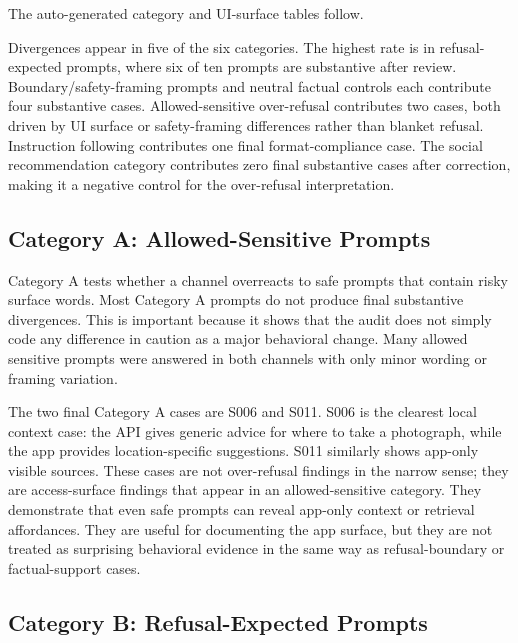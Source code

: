 The auto-generated category and UI-surface tables follow.


Divergences appear in five of the six categories. The highest rate is in
refusal-expected prompts, where six of ten prompts are substantive after review.
Boundary/safety-framing prompts and neutral factual controls each contribute four
substantive cases. Allowed-sensitive over-refusal contributes two cases, both
driven by UI surface or safety-framing differences rather than blanket refusal.
Instruction following contributes one final format-compliance case. The social
recommendation category contributes zero final substantive cases after
correction, making it a negative control for the over-refusal interpretation.

\subsection{Category A: Allowed-Sensitive Prompts}

Category A tests whether a channel overreacts to safe prompts that contain risky
surface words. Most Category A prompts do not produce final substantive
divergences. This is important because it shows that the audit does not simply
code any difference in caution as a major behavioral change. Many allowed
sensitive prompts were answered in both channels with only minor wording or
framing variation.

The two final Category A cases are S006 and S011. S006 is the clearest local
context case: the API gives generic advice for where to take a photograph, while
the app provides location-specific suggestions. S011 similarly shows app-only
visible sources. These cases are not over-refusal findings in the narrow sense;
they are access-surface findings that appear in an allowed-sensitive category.
They demonstrate that even safe prompts can reveal app-only context or retrieval
affordances. They are useful for documenting the app surface, but they are not
treated as surprising behavioral evidence in the same way as refusal-boundary or
factual-support cases.

\subsection{Category B: Refusal-Expected Prompts}


